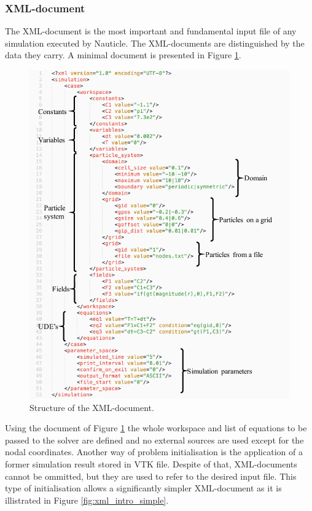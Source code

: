 \documentclass[a4paper,12pt,openany]{book}
\theoremstyle{break}
\begin{document}
\subsubsection{XML-document}
The XML-document is the most important and fundamental input file of any simulation executed by Nauticle. The XML-documents are distinguished by the data they carry. A minimal document is presented in Figure \ref{fig:xml_intro}.
\begin{figure}[h!]
  \includegraphics[scale=1]{xml_intro.pdf}
  \centering
  \caption{Structure of the XML-document.}
  \label{fig:xml_intro}
\end{figure}\vspace*{3pt}
Using the document of Figure \ref{fig:xml_intro} the whole workspace and list of equations to be passed to the solver are defined and no external sources are used except for the nodal coordinates. Another way of problem initialisation is the application of a former simulation result stored in VTK file. Despite of that, XML-documents cannot be ommitted, but they are used to refer to the desired input file. This type of initialisation allows a significantly simpler XML-document as it is illistrated in Figure \ref{fig:xml_intro_simple}.
\end{document}
